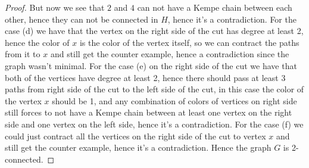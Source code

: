 \begin{proof}
But now we see that $2$ and $4$ can not have a Kempe chain between each other, hence they can not be connected in $H$, hence it's a contradiction.
For the case (d) we have that the vertex on the right side of the cut has degree at least 2, hence the color of $x$ is the color of the vertex itself,
so we can contract the paths from it to $x$ and still get the counter example, hence a contradiction since the graph wasn't minimal.
For the case (e) on the right side of the cut we have that both of the vertices have degree at least 2, hence there should pass at least 3 paths from right 
side of the cut to the left side of the cut, in this case the color of the vertex $x$ should be 1, and any combination of colors of vertices on right side 
still forces to not have a Kempe chain between at least one vertex on the right side and one vertex on the left side, hence it's a contradiction.
For the case (f) we could just contract all the vertices on the right side of the cut to vertex $x$ and still get the counter example, hence it's a contradiction.
Hence the graph $G$ is 2-connected.
\end{proof}
